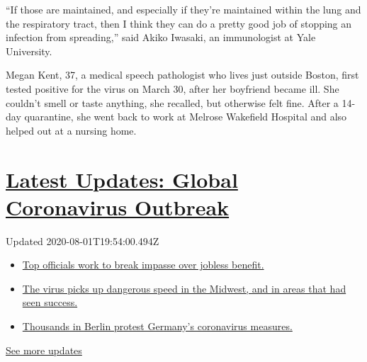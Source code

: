 ``If those are maintained, and especially if they're maintained within
the lung and the respiratory tract, then I think they can do a pretty
good job of stopping an infection from spreading,'' said Akiko Iwasaki,
an immunologist at Yale University.

Megan Kent, 37, a medical speech pathologist who lives just outside
Boston, first tested positive for the virus on March 30, after her
boyfriend became ill. She couldn't smell or taste anything, she
recalled, but otherwise felt fine. After a 14-day quarantine, she went
back to work at Melrose Wakefield Hospital and also helped out at a
nursing home.

\hypertarget{latest-updates-global-coronavirus-outbreak}{%
\section{\texorpdfstring{\href{https://www.nytimes3xbfgragh.onion/2020/08/01/world/coronavirus-covid-19.html?action=click\&pgtype=Article\&state=default\&region=MAIN_CONTENT_1\&context=storylines_live_updates}{Latest
Updates: Global Coronavirus
Outbreak}}{Latest Updates: Global Coronavirus Outbreak}}\label{latest-updates-global-coronavirus-outbreak}}

Updated 2020-08-01T19:54:00.494Z

\begin{itemize}
\tightlist
\item
  \href{https://www.nytimes3xbfgragh.onion/2020/08/01/world/coronavirus-covid-19.html?action=click\&pgtype=Article\&state=default\&region=MAIN_CONTENT_1\&context=storylines_live_updates\#link-3ac56579}{Top
  officials work to break impasse over jobless benefit.}
\item
  \href{https://www.nytimes3xbfgragh.onion/2020/08/01/world/coronavirus-covid-19.html?action=click\&pgtype=Article\&state=default\&region=MAIN_CONTENT_1\&context=storylines_live_updates\#link-8796723}{The
  virus picks up dangerous speed in the Midwest, and in areas that had
  seen success.}
\item
  \href{https://www.nytimes3xbfgragh.onion/2020/08/01/world/coronavirus-covid-19.html?action=click\&pgtype=Article\&state=default\&region=MAIN_CONTENT_1\&context=storylines_live_updates\#link-25930521}{Thousands
  in Berlin protest Germany's coronavirus measures.}
\end{itemize}

\href{https://www.nytimes3xbfgragh.onion/2020/08/01/world/coronavirus-covid-19.html?action=click\&pgtype=Article\&state=default\&region=MAIN_CONTENT_1\&context=storylines_live_updates}{See
more updates}

